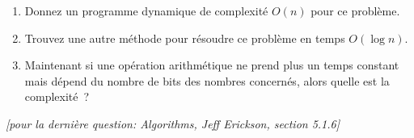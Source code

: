\documentclass[12pt]{article}
\newcommand{\source}[1]{\begin{flushright}\emph{[#1]}\end{flushright}}
\begin{document}
\begin{enumerate}
    \item Donnez un programme dynamique de complexité $O(n)$  pour ce problème.
    \item Trouvez une autre méthode pour résoudre ce problème en temps $O(\log n)$.
    \item Maintenant si une opération arithmétique ne prend plus un temps constant mais dépend du nombre de bits des nombres concernés, alors quelle est la complexité~?
\end{enumerate}

\source{pour la dernière question: Algorithms, Jeff Erickson, section 5.1.6}
\end{document}
